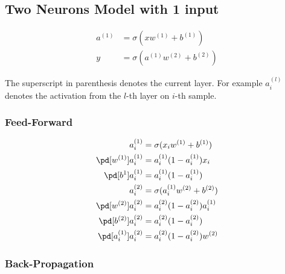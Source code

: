 \documentclass{article}
\begin{document}
\subsection{Two Neurons Model with 1 input}

\def\d{2.0}

\begin{center}
\end{center}

\begin{align}
	a^{(1)} &= \sigma(xw^{(1)} + b^{(1)}) \\
	y &= \sigma(a^{(1)}w^{(2)} + b^{(2)})
\end{align}

The superscript in parenthesis denotes the current layer. For example $a_i^{(l)}$ denotes the activation from the $l$-th layer on $i$-th sample.

\subsubsection{Feed-Forward}

\begin{align}
	a_i^{(1)} &= \sigma(x_iw^{(1)} + b^{(1)}) \\
	\pd[w^{(1)}]a_i^{(1)} &= a_i^{(1)}(1 - a_i^{(1)})x_i \\
	\pd[b^{1}]a_i^{(1)} &= a_i^{(1)}(1 - a_i^{(1)}) \\
	a_i^{(2)} &= \sigma(a_i^{(1)}w^{(2)} + b^{(2)}) \\
	\pd[w^{(2)}]a_i^{(2)} &= a_i^{(2)}(1 - a_i^{(2)})a_i^{(1)} \\
	\pd[b^{(2)}]a_i^{(2)} &= a_i^{(2)}(1 - a_i^{(2)}) \\
	\pd[a_i^{(1)}]a_i^{(2)} &= a_i^{(2)}(1 - a_i^{(2)})w^{(2)}
\end{align}

\subsubsection{Back-Propagation}
\end{document}

